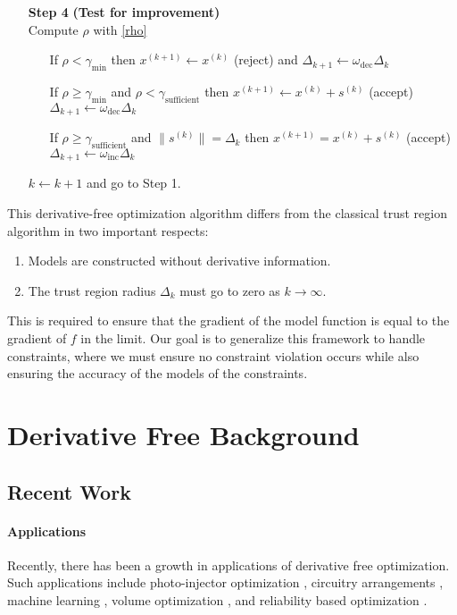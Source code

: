 \documentclass{article}
\theoremstyle{case}
\newcommand{\modelk}{{{m}_f}^{(k)}}
\newcommand{\iteratek}{{x}^{(k)}}
\newcommand{\trialk}{{{s}^{(k)}}}
\newcommand{\iteratekpone}{{x}^{(k+1)}}
\newcommand{\omegainc}{\omega_{\text{inc}}}
\newcommand{\omegadec}{\omega_{\text{dec}}}
\newcommand{\gammasm}{\gamma_{\text{min}}}
\newcommand{\gammabi}{\gamma_{\text{sufficient}}}
\begin{document}
\begin{algorithm}[H]
\begin{itemize}
        \item[\textbf{Step 4}] \textbf{(Test for improvement)} \\
            Compute $\rho$ with \cref{rho} \begin{itemize}
                \item[] If $\rho < \gammasm$ then $\iteratekpone \gets \iteratek$ (reject) and $\Delta_{k+1} \gets \omegadec\Delta_{k}$
                \item[] If $\rho \ge \gammasm$ and $\rho < \gammabi$ then $\iteratekpone\gets\iteratek+\trialk$ (accept) $\Delta_{k+1} \gets \omegadec\Delta_{k}$
                \item[] If $\rho \ge \gammabi$ and $\|\trialk\| = \Delta_{k}$ then $\iteratekpone=\iteratek+\trialk$ (accept) $\Delta_{k+1} \gets \omegainc\Delta_{k}$
            \end{itemize}
            $k \gets k+1$ and go to Step 1.
    \end{itemize}
\end{algorithm}

This derivative-free optimization algorithm differs from the classical trust region algorithm in two important respects:
\begin{enumerate}
    \item Models are constructed without derivative information.
    \item The trust region radius $\Delta_k$ must go to zero as $k\to\infty$.
\end{enumerate}

This is required to ensure that the gradient of the model function is equal to the gradient of $f$ in the limit.
Our goal is to generalize this framework to handle constraints, where we must ensure no constraint violation occurs while also ensuring the accuracy of the models of the constraints.


\section{Derivative Free Background}

\subsection{Recent Work}
\paragraph{Applications}
Recently, there has been a growth in applications of derivative free optimization.
Such applications include photo-injector optimization \cite{1742-6596-874-1-012062}, circuitry arrangements \cite{PLOSKAS201816}, machine learning \cite{KS2018}, volume optimization \cite{Cheng2017}, and reliability based optimization \cite{Gao2017}.
\end{document}
